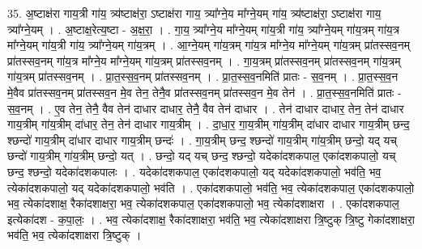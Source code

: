 \documentclass[17pt]{extarticle}
\begin{document}
35. अ॒ष्टाक्ष॑रा गाय॒त्री गा॑य॒ त्र्य॑ष्टाक्ष॑रा॒ ऽष्टाक्ष॑रा गाय॒ त्र्या᳚ग्ने॒य मा᳚ग्ने॒यम् गा॑य॒
त्र्य॑ष्टाक्ष॑रा॒ ऽष्टाक्ष॑रा गाय॒ त्र्या᳚ग्ने॒यम् । . अ॒ष्टाक्ष॒रेत्य॒ष्टा - अ॒क्ष॒रा॒ । . गा॒य॒ त्र्या᳚ग्ने॒य मा᳚ग्ने॒यम् गा॑य॒त्री गा॑य॒ त्र्या᳚ग्ने॒यम् गा॑य॒त्रम् गा॑य॒त्र मा᳚ग्ने॒यम् गा॑य॒त्री गा॑य॒ त्र्या᳚ग्ने॒यम् गा॑य॒त्रम् । . आ॒ग्ने॒यम् गा॑य॒त्रम् गा॑य॒त्र मा᳚ग्ने॒य मा᳚ग्ने॒यम् गा॑य॒त्रम् प्रा॑तस्सव॒नम् प्रा॑तस्सव॒नम् गा॑य॒त्र मा᳚ग्ने॒य मा᳚ग्ने॒यम् गा॑य॒त्रम् प्रा॑तस्सव॒नम् । . गा॒य॒त्रम् प्रा॑तस्सव॒नम् प्रा॑तस्सव॒नम् गा॑य॒त्रम् गा॑य॒त्रम् प्रा॑तस्सव॒नम् । . प्रा॒त॒स्स॒व॒नम् प्रा॑तस्सव॒नम् । . प्रा॒त॒स्स॒व॒नमिति॑ प्रातः - स॒व॒नम् । . प्रा॒त॒स्स॒व॒न मे॒वैव प्रा॑तस्सव॒नम् प्रा॑तस्सव॒न मे॒व तेन॒ तेनै॒व प्रा॑तस्सव॒नम् प्रा॑तस्सव॒न मे॒व तेन॑ । . प्रा॒त॒स्स॒व॒नमिति॑ प्रातः - स॒व॒नम् । . ए॒व तेन॒ तेनै॒ वैव तेन॑ दाधार दाधार॒ तेनै॒ वैव तेन॑ दाधार । . तेन॑ दाधार दाधार॒ तेन॒ तेन॑ दाधार गाय॒त्रीम् गा॑य॒त्रीम् दा॑धार॒ तेन॒ तेन॑ दाधार गाय॒त्रीम् । . दा॒धा॒र॒ गा॒य॒त्रीम् गा॑य॒त्रीम् दा॑धार दाधार गाय॒त्रीम् छन्द॒ श्छन्दो॑ गाय॒त्रीम् दा॑धार दाधार गाय॒त्रीम् छन्दः॑ । . गा॒य॒त्रीम् छन्द॒ श्छन्दो॑ गाय॒त्रीम् गा॑य॒त्रीम् छन्दो॒ यद् यच् छन्दो॑ गाय॒त्रीम् गा॑य॒त्रीम् छन्दो॒ यत् । . छन्दो॒ यद् यच् छन्द॒ श्छन्दो॒ यदेका॑दशकपाल॒ एका॑दशकपालो॒ यच् छन्द॒ श्छन्दो॒ यदेका॑दशकपालः । . यदेका॑दशकपाल॒ एका॑दशकपालो॒ यद् यदेका॑दशकपालो॒ भव॑ति॒ भव॒ त्येका॑दशकपालो॒ यद् यदेका॑दशकपालो॒ भव॑ति । . एका॑दशकपालो॒ भव॑ति॒ भव॒ त्येका॑दशकपाल॒ एका॑दशकपालो॒ भव॒ त्येका॑दशाक्ष॒ रैका॑दशाक्षरा॒ भव॒ त्येका॑दशकपाल॒ एका॑दशकपालो॒ भव॒ त्येका॑दशाक्षरा । . एका॑दशकपाल॒ इत्येका॑दश - क॒पा॒लः॒ । . भव॒ त्येका॑दशाक्ष॒ रैका॑दशाक्षरा॒ भव॑ति॒ भव॒ त्येका॑दशाक्षरा त्रि॒ष्टुक् त्रि॒ष्टु गेका॑दशाक्षरा॒ भव॑ति॒ भव॒ त्येका॑दशाक्षरा त्रि॒ष्टुक् । \newline
\end{document}
